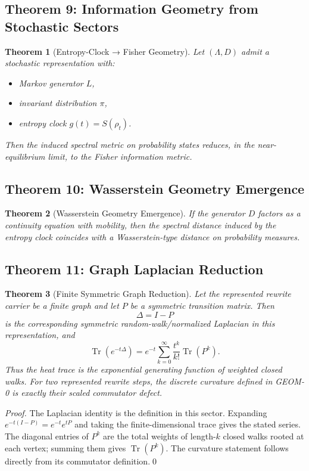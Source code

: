\documentclass[12pt, oneside]{article}
\newtheorem{theorem}{Theorem}[section]
\DeclareMathOperator{\Tr}{Tr}
\begin{document}
\subsection{Theorem 9: Information Geometry from Stochastic Sectors}

\begin{theorem}[Entropy-Clock → Fisher Geometry]
Let $(\Lambda, D)$ admit a stochastic representation with:
\begin{itemize}
    \item Markov generator $L$,
    \item invariant distribution $\pi$,
    \item entropy clock $g(t) = S(\rho_t)$.
\end{itemize}
Then the induced spectral metric on probability states reduces, in the near-equilibrium limit, to the Fisher information metric.
\end{theorem}

\subsection{Theorem 10: Wasserstein Geometry Emergence}

\begin{theorem}[Wasserstein Geometry Emergence]
If the generator $D$ factors as a continuity equation with mobility, then the spectral distance induced by the entropy clock coincides with a Wasserstein-type distance on probability measures.
\end{theorem}

\subsection{Theorem 11: Graph Laplacian Reduction}

\begin{theorem}[Finite Symmetric Graph Reduction]
Let the represented rewrite carrier be a finite graph and let $P$ be a symmetric transition matrix. Then
\[
\Delta=I-P
\]
is the corresponding symmetric random-walk/normalized Laplacian in this representation, and
\[
\Tr(e^{-t\Delta})
=e^{-t}\sum_{k=0}^{\infty}\frac{t^k}{k!}\Tr(P^k).
\]
Thus the heat trace is the exponential generating function of weighted closed walks. For two represented rewrite steps, the discrete curvature defined in GEOM-0 is exactly their scaled commutator defect.
\end{theorem}

\begin{proof}
The Laplacian identity is the definition in this sector. Expanding $e^{-t(I-P)}=e^{-t}e^{tP}$ and taking the finite-dimensional trace gives the stated series. The diagonal entries of $P^k$ are the total weights of length-$k$ closed walks rooted at each vertex; summing them gives $\Tr(P^k)$. The curvature statement follows directly from its commutator definition.\qed
\end{proof}
\end{document}
